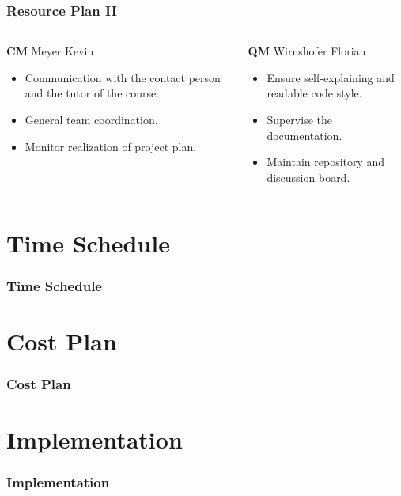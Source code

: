 \documentclass[hyperref={pdfpagelabels=false}]{beamer}
\begin{document}
\begin{frame}
	\frametitle{Resource Plan II}
	\begin{columns}[t]
		\begin{column}{0.50\textwidth}
			\begin{block}{\textbf{CM} Meyer Kevin}
				\begin{itemize}
					\item Communication with the contact person and the tutor of the course.
					\item General team coordination.
					\item Monitor realization of project plan.
				\end{itemize}
			\end{block}
		\end{column}
		
		\begin{column}{0.50\textwidth}
			\begin{block}{\textbf{QM} Wirnshofer Florian}
				\begin{itemize}
					\item Ensure self-explaining and readable code style.
					\item Supervise the documentation.
					\item Maintain repository and discussion board.
				\end{itemize}
			\end{block}
		\end{column}
	\end{columns}
\end{frame}

\section{Time Schedule} 
\begin{frame}
	\frametitle{Time Schedule} 
\end{frame}

\section{Cost Plan} 
\begin{frame}
	\frametitle{Cost Plan} 
\end{frame}

\section{Implementation} 
\begin{frame}
	\frametitle{Implementation} 
\end{frame}
\end{document}
